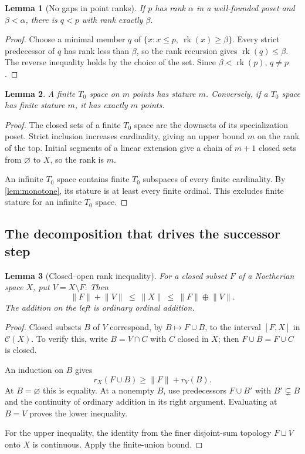 \documentclass[11pt,a4paper]{article}
\newtheorem{lemma}[lemma]{Lemma}
\theoremstyle{definition}
\newcommand{\Cl}{\mathcal C}
\newcommand{\rk}{\operatorname{rk}}
\newcommand{\st}[1]{\lVert #1\rVert}
\newcommand{\ds}{\mathbin{\sqcup}}
\numberwithin{equation}{section}
\begin{document}
\begin{lemma}[No gaps in point ranks]\label{lem:gaps}
If $p$ has rank $\alpha$ in a well-founded poset and $\beta<\alpha$, there
is $q<p$ with rank exactly $\beta$.
\end{lemma}
\begin{proof}
Choose a minimal member $q$ of
$\{x:x\leq p,\ \rk(x)\geq\beta\}$.  Every strict predecessor of $q$ has
rank less than $\beta$, so the rank recursion gives $\rk(q)\leq\beta$.
The reverse inequality holds by the choice of the set.  Since
$\beta<\rk(p)$, $q\ne p$.
\end{proof}

\begin{lemma}\label{lem:finite}
A finite $T_0$ space on $m$ points has stature $m$.  Conversely, if a
$T_0$ space has finite stature $m$, it has exactly $m$ points.
\end{lemma}
\begin{proof}
The closed sets of a finite $T_0$ space are the downsets of its
specialization poset.  Strict inclusion increases cardinality, giving an
upper bound $m$ on the rank of the top.  Initial segments of a linear
extension give a chain of $m+1$ closed sets from $\varnothing$ to $X$,
so the rank is $m$.

An infinite $T_0$ space contains finite $T_0$ subspaces of every finite
cardinality.  By \cref{lem:monotone}, its stature is at least every finite
ordinal.  This excludes finite stature for an infinite $T_0$ space.
\end{proof}

\subsection{The decomposition that drives the successor step}

\begin{lemma}[Closed--open rank inequality]\label{lem:semiadd}
For a closed subset $F$ of a Noetherian space $X$, put $V=X\setminus F$.
Then
\begin{equation}\label{eq:semiadd}
 \st F+\st V\ \leq\ \st X\ \leq\ \st F\oplus\st V.
\end{equation}
The addition on the left is ordinary ordinal addition.
\end{lemma}
\begin{proof}
Closed subsets $B$ of $V$ correspond, by $B\mapsto F\cup B$, to the
interval $[F,X]$ in $\Cl(X)$.  To verify this, write $B=V\cap C$ with
$C$ closed in $X$; then $F\cup B=F\cup C$ is closed.

An induction on $B$ gives
\[
 r_X(F\cup B)\geq\st F+r_V(B).
\]
At $B=\varnothing$ this is equality.  At a nonempty $B$, use predecessors
$F\cup B'$ with $B'\subsetneq B$ and the continuity of ordinary addition
in its right argument.  Evaluating at $B=V$ proves the lower inequality.

For the upper inequality, the identity from the finer disjoint-sum
topology $F\ds V$ onto $X$ is continuous.  Apply the finite-union bound.
\end{proof}
\end{document}
